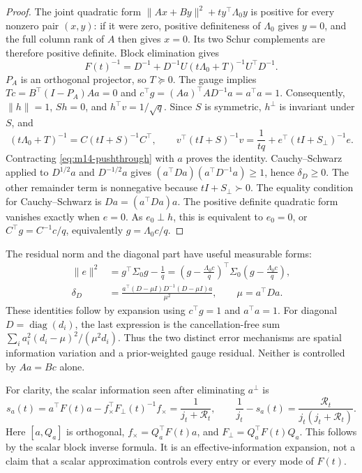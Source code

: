 \begin{proof}
The joint quadratic form
$\|Ax+By\|^2+t y^\top\Lambda_0y$ is positive for every nonzero pair
$(x,y)$: if it were zero, positive definiteness of $\Lambda_0$ gives $y=0$,
and the full column rank of $A$ then gives $x=0$.  Its two Schur complements
are therefore positive definite.  Block elimination gives
\begin{equation}
 F(t)^{-1}=D^{-1}+D^{-1}U(t\Lambda_0+T)^{-1}U^\top D^{-1}.
 \label{eq:m14-pushthrough}
\end{equation}
$P_A$ is an orthogonal projector, so $T\succeq0$.  The gauge implies
$Tc=B^\top(I-P_A)Aa=0$ and
$c^\top g=(Aa)^\top AD^{-1}a=a^\top a=1$.
Consequently, $\|h\|=1$, $Sh=0$, and $h^\top v=1/\sqrt q$.
Since $S$ is symmetric, $h^\perp$ is invariant under $S$, and
\begin{equation}
 (t\Lambda_0+T)^{-1}=C(tI+S)^{-1}C^\top,\qquad
 v^\top(tI+S)^{-1}v=\frac{1}{tq}
                   +e^\top(tI+S_\perp)^{-1}e.
\end{equation}
Contracting \eqref{eq:m14-pushthrough} with $a$ proves the identity.
Cauchy--Schwarz applied to $D^{1/2}a$ and $D^{-1/2}a$ gives
$(a^\top Da)(a^\top D^{-1}a)\geq1$, hence $\delta_D\geq0$.
The other remainder term is nonnegative because $tI+S_\perp\succ0$.
The equality condition for Cauchy--Schwarz is $Da=(a^\top Da)a$.
The positive definite quadratic form vanishes exactly when $e=0$.
As $e_0\perp h$, this is equivalent to $e_0=0$, or
$C^\top g=C^{-1}c/q$, equivalently $g=\Lambda_0c/q$.
\end{proof}

The residual norm and the diagonal part have useful measurable forms:
\begin{align}
 \|e\|^2
 &=g^\top\Sigma_0g-\frac1q
   =\left(g-\frac{\Lambda_0c}{q}\right)^\top
       \Sigma_0\left(g-\frac{\Lambda_0c}{q}\right),
 \label{eq:m14-prior-residual}\\
 \delta_D
 &=\frac{a^\top(D-\mu I)D^{-1}(D-\mu I)a}{\mu^2},\qquad
 \mu=a^\top Da.
 \label{eq:m14-diagonal-residual}
\end{align}
These identities follow by expansion using $c^\top g=1$ and $a^\top a=1$.
For diagonal $D=\operatorname{diag}(d_i)$, the last expression is the
cancellation-free sum $\sum_i a_i^2(d_i-\mu)^2/(\mu^2d_i)$.
Thus the two distinct error mechanisms are spatial information variation
and a prior-weighted gauge residual.  Neither is controlled by $Aa=Bc$ alone.

For clarity, the scalar information seen after eliminating $a^\perp$ is
\begin{equation}
 s_a(t)=a^\top F(t)a-f_\times^\top F_\perp(t)^{-1}f_\times
       =\frac1{j_t+\mathcal R_t},\qquad
 \frac1{j_t}-s_a(t)=\frac{\mathcal R_t}{j_t(j_t+\mathcal R_t)}.
 \label{eq:m14-scalar-schur}
\end{equation}
Here $[a,Q_a]$ is orthogonal, $f_\times=Q_a^\top F(t)a$, and
$F_\perp=Q_a^\top F(t)Q_a$.  This follows by the scalar block inverse formula.
It is an effective-information expansion, not a claim that a scalar
approximation controls every entry or every mode of $F(t)$.

